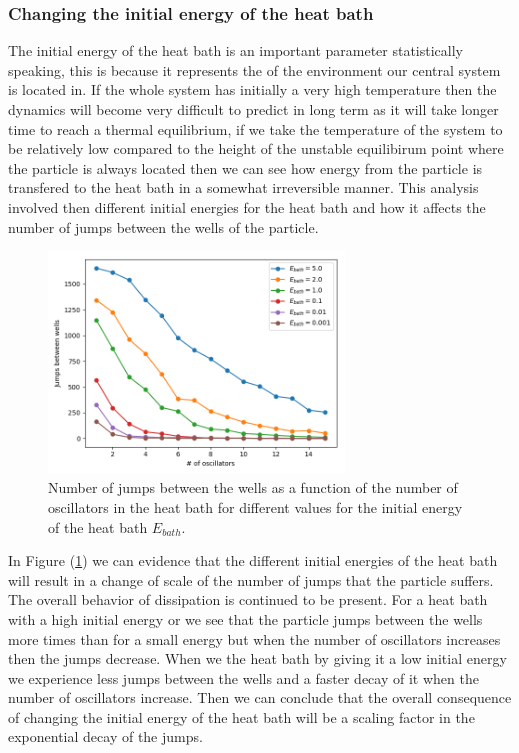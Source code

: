 \subsubsection{Changing the initial energy of the heat bath}
The initial energy of the heat bath is an important parameter statistically speaking, this is because it represents the  of the environment our central system is located in. If the whole system has initially a very high temperature then the dynamics will become very difficult to predict in long term as it will take longer time to reach a thermal equilibrium, if we take the temperature of the system to be relatively low compared to the height of the unstable equilibirum point where the particle is always located then we can see how energy from the particle is transfered to the heat bath in a somewhat irreversible manner. This analysis involved then different initial energies for the heat bath and how it affects the number of jumps between the wells of the particle.\par 

\begin{figure}[H]
\centering
\includegraphics[width=0.7\textwidth]{Figures/change_E_number.png}
\caption{Number of jumps between the wells as a function of the number of oscillators in the heat bath for different values for the initial energy of the heat bath $E_{bath}$.
}
\label{fig:changing_E}
\end{figure} 

In Figure (\ref{fig:changing_E}) we can evidence that the different initial energies of the heat bath will result in a change of scale of the number of jumps that the particle suffers. The overall behavior of dissipation is continued to be present. For a heat bath with a high initial energy or  we see that the particle jumps between the wells more times than for a small energy but when the number of oscillators increases then the jumps decrease. When we  the heat bath by giving it a low initial energy we experience less jumps between the wells and a faster decay of it when the number of oscillators increase. Then we can conclude that the overall consequence of changing the initial energy of the heat bath will be a scaling factor in the exponential decay of the jumps.



